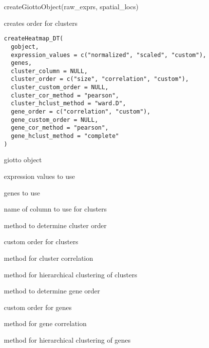 \documentclass[a4paper]{book}
\begin{document}
%
\begin{Examples}
\begin{ExampleCode}
    createGiottoObject(raw_exprs, spatial_locs)
\end{ExampleCode}
\end{Examples}
%
\begin{Description}\relax
creates order for clusters
\end{Description}
%
\begin{Usage}
\begin{verbatim}
createHeatmap_DT(
  gobject,
  expression_values = c("normalized", "scaled", "custom"),
  genes,
  cluster_column = NULL,
  cluster_order = c("size", "correlation", "custom"),
  cluster_custom_order = NULL,
  cluster_cor_method = "pearson",
  cluster_hclust_method = "ward.D",
  gene_order = c("correlation", "custom"),
  gene_custom_order = NULL,
  gene_cor_method = "pearson",
  gene_hclust_method = "complete"
)
\end{verbatim}
\end{Usage}
%
\begin{Arguments}
\begin{ldescription}
\item[\code{gobject}] giotto object

\item[\code{expression\_values}] expression values to use

\item[\code{genes}] genes to use

\item[\code{cluster\_column}] name of column to use for clusters

\item[\code{cluster\_order}] method to determine cluster order

\item[\code{cluster\_custom\_order}] custom order for clusters

\item[\code{cluster\_cor\_method}] method for cluster correlation

\item[\code{cluster\_hclust\_method}] method for hierarchical clustering of clusters

\item[\code{gene\_order}] method to determine gene order

\item[\code{gene\_custom\_order}] custom order for genes

\item[\code{gene\_cor\_method}] method for gene correlation

\item[\code{gene\_hclust\_method}] method for hierarchical clustering of genes
\end{ldescription}
\end{Arguments}
\end{document}
